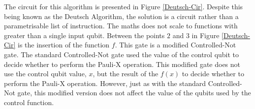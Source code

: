 The circuit for this algorithm is presented in Figure \ref{Deutsch-Cir}.
Despite this being known as the Deutsch Algorithm, the solution is a circuit rather than a parametrisable list of instruction.
The maths does not scale to functions with greater than a single input qubit.
Between the points $2$ and $3$ in Figure \ref{Deutsch-Cir} is the insertion of the function $f$.
This gate is a modified Controlled-Not gate.
The standard Controlled-Not gate used the value of the control qubit to decide whether to perform the Pauli-X operation.
This modified gate does not use the control qubit value, $x$, but the result of the $f(x)$ to decide whether to perform the Pauli-X operation.
However, just as with the standard Controlled-Not gate, this modified version does not affect the value of the qubits used by the control function.

